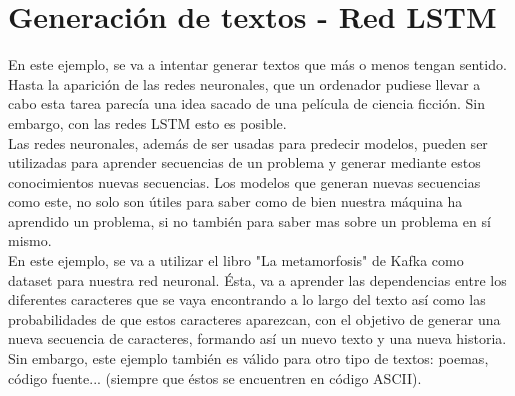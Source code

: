 \section{Generación de textos - Red LSTM}
En este ejemplo, se va a intentar generar textos que más o menos tengan sentido. Hasta la aparición de las redes neuronales, que un ordenador pudiese llevar a cabo esta tarea parecía una idea sacado de una película de ciencia ficción. Sin embargo, con las redes LSTM esto es posible.\\
Las redes neuronales, además de ser usadas para predecir modelos, pueden ser utilizadas para aprender secuencias de un problema y generar mediante estos conocimientos nuevas secuencias. Los modelos que generan nuevas secuencias como este, no solo son útiles para saber como de bien nuestra máquina ha aprendido un problema, si no también para saber mas sobre un problema en sí mismo.\\
En este ejemplo, se va a utilizar el libro "La metamorfosis" de Kafka como dataset para nuestra red neuronal. Ésta, va a aprender las dependencias entre los diferentes caracteres que se vaya encontrando a lo largo del texto así como las probabilidades de que estos caracteres aparezcan, con el objetivo de generar una nueva secuencia de caracteres, formando así un nuevo texto y una nueva historia. Sin embargo, este ejemplo también es válido para otro tipo de textos: poemas, código fuente... (siempre que éstos se encuentren en código ASCII).
